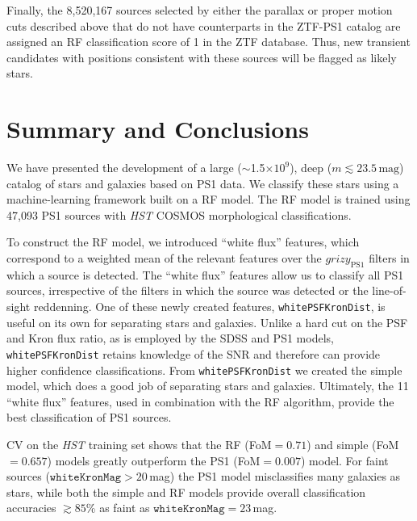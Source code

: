 \documentclass[twocolumn]{aastex62}
\begin{document}
\begin{CJK*}{UTF8}{gbsn}
Finally, the 8,520,167 sources selected by either the parallax or proper
motion cuts described above that do not have counterparts in the ZTF-PS1
catalog are assigned an RF classification score of 1 in the ZTF database.
Thus, new transient candidates with positions consistent with these sources
will be flagged as likely stars.

\section{Summary and Conclusions}

We have presented the development of a large ($\sim$1.5$\times 10^{9}$),
deep ($m \lesssim 23.5\,\mathrm{mag}$) catalog of stars and galaxies based
on PS1 data. We classify these stars using a machine-learning framework
built on a RF model. The RF model is trained using 47,093 PS1 sources with
\textit{HST} COSMOS morphological classifications.

To construct the RF model, we introduced ``white flux'' features, which
correspond to a weighted mean of the relevant features over the
$grizy_{\mathrm {PS1}}$ filters in which a source is detected. The ``white
flux'' features allow us to classify all PS1 sources, irrespective of the
filters in which the source was detected or the line-of-sight reddenning.
One of these newly created features, \texttt{whitePSFKronDist}, is useful on
its own for separating stars and galaxies. Unlike a hard cut on the PSF and
Kron flux ratio, as is employed by the SDSS and PS1 models,
\texttt{whitePSFKronDist} retains knowledge of the SNR and therefore can
provide higher confidence classifications. From \texttt{whitePSFKronDist} we
created the simple model, which does a good job of separating stars and
galaxies. Ultimately, the 11 ``white flux'' features, used in combination
with the RF algorithm, provide the best classification of PS1 sources.

CV on the \textit{HST} training set shows that the RF (FoM$ = 0.71$) and
simple (FoM$ = 0.657$) models greatly outperform the PS1 (FoM$ = 0.007$)
model. For faint sources ($\mathtt{whiteKronMag} > 20$\,mag) the PS1 model
misclassifies many galaxies as stars, while both the simple and RF models
provide overall classification accuracies $\gtrsim 85$\% as faint as
$\mathtt{whiteKronMag} = 23$\,mag.


\end{CJK*}
\end{document}
